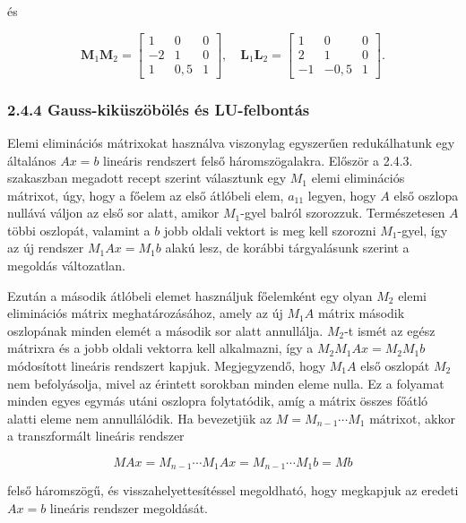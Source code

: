 \documentclass[
  magyar,
  11pt]{article}
\providecommand{\boldsymbol}[1]{\mathbf{#1}}
\begin{document}
és

\[\boldsymbol{M}_1 \boldsymbol{M}_2 = \begin{bmatrix} 1 & 0 & 0 \\ -2 & 1 & 0 \\ 1 & 0{,}5 & 1 \end{bmatrix}, \quad \boldsymbol{L}_1 \boldsymbol{L}_2 = \begin{bmatrix} 1 & 0 & 0 \\ 2 & 1 & 0 \\ -1 & -0{,}5 & 1 \end{bmatrix}.\]

\subsubsection{2.4.4 Gauss-kiküszöbölés és
LU-felbontás}\label{gauss-kikuxfcszuxf6buxf6luxe9s-uxe9s-lu-felbontuxe1s}

Elemi eliminációs mátrixokat használva viszonylag egyszerűen
redukálhatunk egy általános \(Ax = b\) lineáris rendszert felső
háromszögalakra. Először a 2.4.3. szakaszban megadott recept szerint
választunk egy \(M_1\) elemi eliminációs mátrixot, úgy, hogy a főelem az
első átlóbeli elem, \(a_{11}\) legyen, hogy \(A\) első oszlopa nullává
váljon az első sor alatt, amikor \(M_1\)-gyel balról szorozzuk.
Természetesen \(A\) többi oszlopát, valamint a \(b\) jobb oldali vektort
is meg kell szorozni \(M_1\)-gyel, így az új rendszer
\(M_1 A x = M_1 b\) alakú lesz, de korábbi tárgyalásunk szerint a
megoldás változatlan.

Ezután a második átlóbeli elemet használjuk főelemként egy olyan \(M_2\)
elemi eliminációs mátrix meghatározásához, amely az új \(M_1 A\) mátrix
második oszlopának minden elemét a második sor alatt annullálja.
\(M_2\)-t ismét az egész mátrixra és a jobb oldali vektorra kell
alkalmazni, így a \(M_2 M_1 A x = M_2 M_1 b\) módosított lineáris
rendszert kapjuk. Megjegyzendő, hogy \(M_1 A\) első oszlopát \(M_2\) nem
befolyásolja, mivel az érintett sorokban minden eleme nulla. Ez a
folyamat minden egyes egymás utáni oszlopra folytatódik, amíg a mátrix
összes főátló alatti eleme nem annullálódik. Ha bevezetjük az
\(M = M_{n-1} \cdots M_1\) mátrixot, akkor a transzformált lineáris
rendszer

\[MAx = M_{n-1} \cdots M_1 Ax = M_{n-1} \cdots M_1 b = Mb\]

felső háromszögű, és visszahelyettesítéssel megoldható, hogy megkapjuk
az eredeti \(Ax = b\) lineáris rendszer megoldását.
\end{document}
